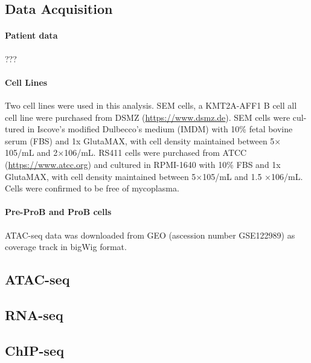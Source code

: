 

\subsection{Data Acquisition }

\paragraph{Patient data}


???

\paragraph{Cell Lines}


Two cell lines were used in this analysis. SEM cells, a KMT2A-AFF1 B cell \gls{all} cell line were purchased from DSMZ (\url{https://www.dsmz.de}). SEM cells were cul- tured in Iscove’s modified Dulbecco’s medium (IMDM) with 10\% fetal bovine serum (FBS) and 1x GlutaMAX, with cell density maintained between 5× 105/mL and 2×106/mL. RS411 cells were purchased from ATCC (\url{https://www.atcc.org}) and cultured in RPMI-1640 with 10\% FBS and 1x GlutaMAX, with cell density maintained between 5×105/mL and 1.5 ×106/mL. Cells were confirmed to be free of mycoplasma.

\paragraph{Pre-ProB and ProB cells}

ATAC-seq data was downloaded from GEO (ascession number GSE122989) as coverage track in bigWig format. 

\subsection{ATAC-seq}
\subsection{RNA-seq}
\subsection{ChIP-seq}
